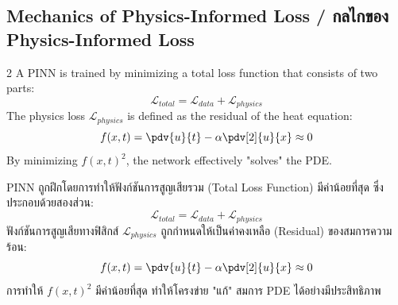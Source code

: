\subsection{Mechanics of Physics-Informed Loss \quad / \quad \textthai{กลไกของ Physics-Informed Loss}}
\begin{paracol}{2}
A PINN is trained by minimizing a total loss function that consists of two parts:
\begin{equation}
    \mathcal{L}_{total} = \mathcal{L}_{data} + \mathcal{L}_{physics}
\end{equation}
The physics loss $\mathcal{L}_{physics}$ is defined as the residual of the heat equation:
\begin{equation}
    f(x, t) = \pdv{u}{t} - \alpha \pdv[2]{u}{x} \approx 0
\end{equation}
By minimizing $f(x, t)^2$, the network effectively "solves" the PDE.

\switchcolumn

\begin{thai}
PINN ถูกฝึกโดยการทำให้ฟังก์ชันการสูญเสียรวม (Total Loss Function) มีค่าน้อยที่สุด ซึ่งประกอบด้วยสองส่วน:
\begin{equation}
    \mathcal{L}_{total} = \mathcal{L}_{data} + \mathcal{L}_{physics}
\end{equation}
ฟังก์ชันการสูญเสียทางฟิสิกส์ $\mathcal{L}_{physics}$ ถูกกำหนดให้เป็นค่าคงเหลือ (Residual) ของสมการความร้อน:
\begin{equation}
    f(x, t) = \pdv{u}{t} - \alpha \pdv[2]{u}{x} \approx 0
\end{equation}
การทำให้ $f(x, t)^2$ มีค่าน้อยที่สุด ทำให้โครงข่าย "แก้" สมการ PDE ได้อย่างมีประสิทธิภาพ
\end{thai}
\end{paracol}
